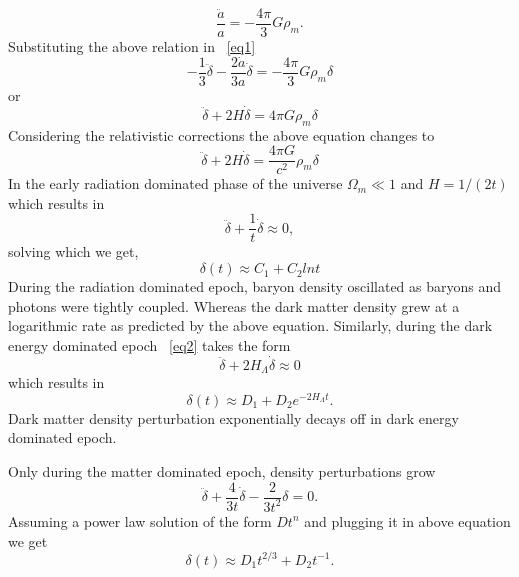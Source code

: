 \begin{equation}
\frac{\ddot{a}}{a}  = -\frac{4 \pi}{3} G\rho_{m}.
\end{equation}
Substituting the above relation in ~\ref{eq1}
\begin{equation}
- \frac{1}{3}\ddot{\delta} - \frac{2\dot{a}}{3a} \dot{\delta}  = -\frac{4 \pi}{3} G\rho_{m}\delta
\end{equation}
or
\begin{equation}
\ddot{\delta} + 2 H\dot{\delta} = 4\pi G \rho_{m} \delta
\end{equation}
Considering the relativistic corrections the above equation changes to 
\begin{equation}
\ddot{\delta} + 2 H \dot{\delta} = \frac{4\pi G}{c^{2}} \rho_{m} \delta
\label{eq2}
\end{equation}
In the early radiation dominated phase of the universe $\Omega_{m} \ll 1$ and $H = 1/(2t)$ which results in 
\begin{equation}
\ddot{\delta} + \frac{1}{t} \dot{\delta} \approx 0,
\end{equation}
solving which we get,
\begin{equation}
\delta(t) \approx C_{1} + C_{2} lnt
\end{equation}
During the radiation dominated epoch, baryon density oscillated as baryons and photons were tightly coupled. 
Whereas the dark matter density grew at a logarithmic rate as predicted by the above equation.  
Similarly, during the dark energy dominated epoch ~\ref{eq2} takes the form
\begin{equation}
\ddot{\delta} + 2 H_{\Lambda} \dot{\delta} \approx 0
\end{equation}
which results in
\begin{equation}
\delta(t) \approx D_{1} + D_{2}e^{-2H_{\Lambda} t}.
\end{equation}
Dark matter density perturbation exponentially decays off in dark energy dominated epoch. 


Only during the matter dominated epoch, density perturbations grow
\begin{equation}
\ddot{\delta} + \frac{4}{3t} \dot{\delta} -\frac{2}{3t^{2}} \delta = 0.
\end{equation}  
Assuming a power law solution of the form $Dt^{n}$  and plugging it in above equation we get
\begin{equation}
\delta(t) \approx D_{1} t^{2/3} + D_{2} t^{-1}.
\end{equation}

